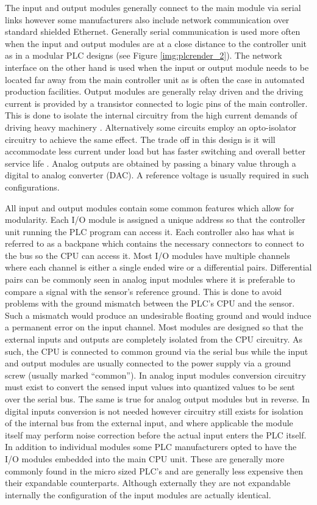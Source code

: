 The input and output modules generally connect to the main module via serial links however some manufacturers also include network communication over standard shielded Ethernet\cite{rockwell_io,rockwell_tech_pub}. Generally serial communication is used more often when the input and output modules are at a close distance to the controller unit as in a modular PLC designs  (see Figure \ref{img:plcrender_2}). The network interface on the other hand is used when the input or output module needs to be located far away from the main controller unit \cite{rockwell_tech_pub} as is often the case in automated production facilities. Output modules are generally relay driven and the driving current is provided by a transistor connected to logic pins of the main controller. This is done to isolate the internal circuitry from the high current demands of driving heavy machinery \cite{plcapp}. Alternatively some circuits employ an opto-isolator circuitry to achieve the same effect. The trade off in this design is it will accommodate less current under load but has faster switching and overall better service life \cite{plcapp}. Analog outputs are obtained by passing a binary value through a digital to analog converter (DAC). A reference voltage is usually required in such configurations.

All input and output modules contain some common  features which allow for modularity. Each I/O module is assigned a unique address so that the controller unit running the PLC program can access it. Each controller also has what is referred to as a backpane which contains the necessary connectors to connect to the bus so the CPU can access it. Most I/O modules have multiple channels where each channel is either a single ended wire or a differential pairs. Differential pairs can be commonly seen in analog input modules where it is preferable to compare a signal with the sensor's reference ground. This is done to avoid problems with the ground mismatch between the PLC's CPU and the sensor. Such a mismatch would produce an undesirable floating ground and would induce a permanent error on the input channel. Most modules are designed so that the external inputs and outputs are completely isolated from the CPU circuitry. As such, the CPU is connected to common ground via the serial bus while the input and output modules are usually connected to the power supply via a ground screw (usually marked ``common''). In analog input modules conversion circuitry must exist to convert the sensed input values into quantized values to be sent over the serial bus. The same is true for analog output modules but in reverse. In digital inputs conversion is not needed however circuitry still exists for isolation of the internal bus from the external input, and where applicable the module itself may perform noise correction before the actual input enters the PLC itself. In addition to individual modules some PLC manufacturers opted to have the I/O modules embedded into the main CPU unit. These are generally more commonly found in the micro sized PLC's and are generally less expensive then their expandable counterparts. Although externally they are not expandable internally the configuration of the input modules are actually identical.

